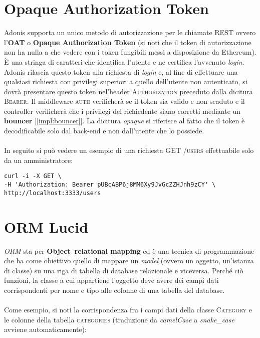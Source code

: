 \section{Opaque Authorization Token}
\label{impl:oat}
Adonis supporta un unico metodo di autorizzazione per le chiamate REST ovvero l'\textbf{OAT} o \textbf{Opaque Authorization Token} (si noti che il token di autorizzazione non ha nulla a che vedere con i token fungibili messi a disposizione da Ethereum). È una stringa di caratteri che identifica l'utente e ne certifica l'avvenuto \textit{login}. Adonis rilascia questo token alla richiesta di \textit{login} e, al fine di effettuare una qualsiasi richiesta con privilegi superiori a quello dell'utente non autenticato, si dovrà presentare questo token nel'header \textsc{Authorization} preceduto dalla dicitura \textsc{Bearer}. Il middleware \textsc{auth} verificherà se il token sia valido e non scaduto e il controller verificherà che i privilegi del richiedente siano corretti mediante un \textbf{bouncer} [\autoref{impl:bouncer}]. La dicitura \textit{opaque} si riferisce al fatto che il token è decodificabile solo dal back-end e non dall'utente che lo possiede.
\\\\
In seguito si può vedere un esempio di una richiesta GET \textsc{/users} effettuabile solo da un amministratore:
\begin{lstlisting}
curl -i -X GET \
-H 'Authorization: Bearer pUBcABP6j8MM6Xy9JvGcZZHJnh9zCY' \
http://localhost:3333/users
\end{lstlisting}


\section{ORM Lucid}
\label{impl:orm}
\textit{ORM} sta per \textbf{Object–relational mapping} ed è una tecnica di programmazione che ha come obiettivo quello di mappare un \textit{model} (ovvero un oggetto, un'istanza di classe) su una riga di tabella di database relazionale e viceversa. Perché ciò funzioni, la classe a cui appartiene l'oggetto deve avere dei campi dati corrispondenti per nome e tipo alle colonne di una tabella del database.
\\\\
Come esempio, si noti la corrispondenza fra i campi dati della classe \textsc{Category} e le colonne della tabella \textsc{categories} (traduzione da \textit{camelCase} a \textit{snake\_case} avviene automaticamente):

